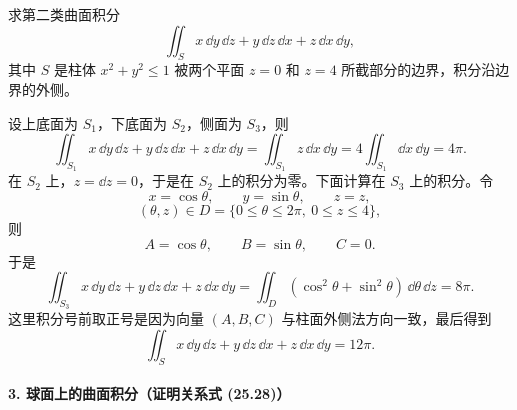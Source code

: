 \begin{xexample}[25.5.2]
求第二类曲面积分
\[
  \iint_S x\,\dd y\,\dd z+y\,\dd z\,\dd x+z\,\dd x\,\dd y,
\]
其中 $S$ 是柱体 $x^2+y^2\le1$ 被两个平面 $z=0$ 和 $z=4$ 所截部分的边界，积分沿边界的外侧。
\end{xexample}

\begin{xsolution}
设上底面为 $S_1$，下底面为 $S_2$，侧面为 $S_3$，则
\[
  \iint_{S_1}x\,\dd y\,\dd z+y\,\dd z\,\dd x+z\,\dd x\,\dd y
  =\iint_{S_1}z\,\dd x\,\dd y
  =4\iint_{S_1}\dd x\,\dd y=4\pi.
\]
在 $S_2$ 上，$z=\dd z=0$，于是在 $S_2$ 上的积分为零。下面计算在 $S_3$ 上的积分。令
\[
  x=\cos\theta,\qquad y=\sin\theta,\qquad z=z,
\]
\[
  (\theta,z)\in D=\{0\le\theta\le2\pi,\ 0\le z\le4\},
\]
则
\[
  A=\cos\theta,\qquad B=\sin\theta,\qquad C=0.
\]
于是
\[
  \iint_{S_3}x\,\dd y\,\dd z+y\,\dd z\,\dd x+z\,\dd x\,\dd y
  =\iint_D(\cos^2\theta+\sin^2\theta)\,\dd\theta\,\dd z=8\pi.
\]
这里积分号前取正号是因为向量 $(A,B,C)$ 与柱面外侧法方向一致，最后得到
\[
  \iint_Sx\,\dd y\,\dd z+y\,\dd z\,\dd x+z\,\dd x\,\dd y=12\pi.
\]
\end{xsolution}

\paragraph{3. 球面上的曲面积分（证明关系式 (25.28)）}

